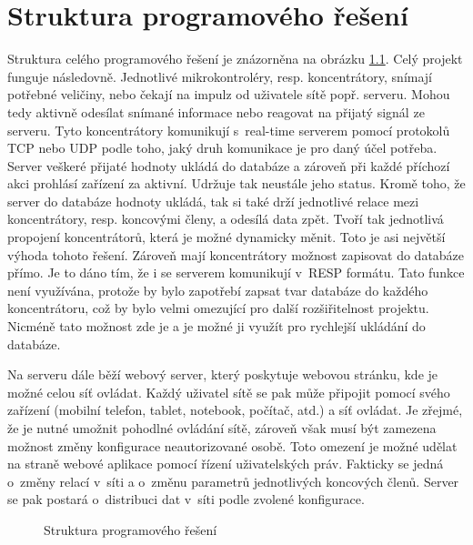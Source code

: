 \chapter{Struktura programového řešení}
Struktura celého programového řešení je znázorněna na obrázku \ref{fig:speedy}. Celý projekt funguje následovně. Jednotlivé mikrokontroléry, resp. koncentrátory, snímají potřebné veličiny, nebo čekají na impulz od uživatele sítě popř. serveru. Mohou tedy aktivně odesílat snímané informace nebo reagovat na přijatý signál ze serveru. Tyto koncentrátory komunikují s~real-time serverem pomocí protokolů TCP nebo UDP podle toho, jaký druh komunikace je pro daný účel potřeba. Server veškeré přijaté hodnoty ukládá do databáze a zároveň při každé příchozí akci prohlásí zařízení za aktivní. Udržuje tak neustále jeho status. Kromě toho, že server do databáze hodnoty ukládá, tak si také drží jednotlivé relace mezi koncentrátory, resp. koncovými členy, a odesílá data zpět. Tvoří tak jednotlivá propojení koncentrátorů, která je možné dynamicky měnit. Toto je asi největší výhoda tohoto řešení. Zároveň mají koncentrátory možnost zapisovat do databáze přímo. Je to dáno tím, že i se serverem komunikují v~RESP formátu. Tato funkce není využívána, protože by bylo zapotřebí zapsat tvar databáze do každého koncentrátoru, což by bylo velmi omezující pro další rozšiřitelnost projektu. Nicméně tato možnost zde je a je možné ji využít pro rychlejší ukládání do databáze.

Na serveru dále běží webový server, který poskytuje webovou stránku, kde je možné celou síť ovládat. Každý uživatel sítě se pak může připojit pomocí svého zařízení (mobilní telefon, tablet, notebook, počítač, atd.) a síť ovládat. Je zřejmé, že je nutné umožnit pohodlné ovládání sítě, zároveň však musí být zamezena možnost změny konfigurace neautorizované osobě. Toto omezení je možné udělat na straně webové aplikace pomocí řízení uživatelských práv. Fakticky se jedná o~změny relací v~síti a o~změnu parametrů jednotlivých koncových členů. Server se pak postará o~distribuci dat v~síti podle zvolené konfigurace.

\begin{figure}[H]
    \centering
	\caption{Struktura programového řešení}
	\label{fig:speedy}
\end{figure}

